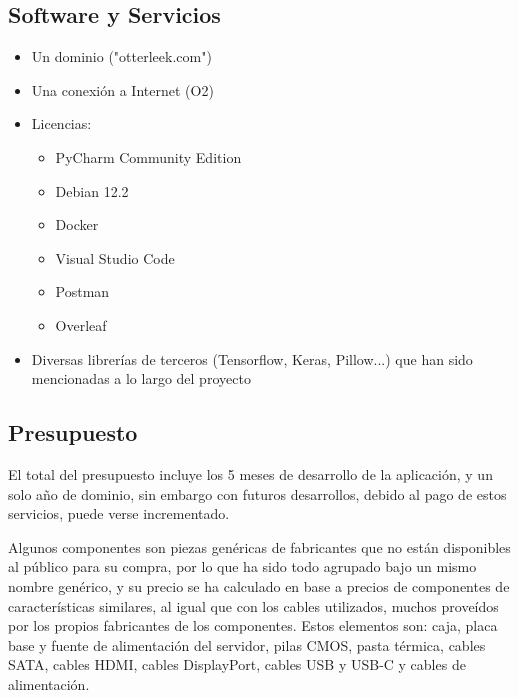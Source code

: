 \documentclass{article}
\begin{document}
\subsection{Software y Servicios}
\begin{itemize}
	\item Un dominio ("otterleek.com")
	\item Una conexión a Internet (O2)
	\item Licencias:
	\begin{itemize}
    	\item PyCharm Community Edition
    	\item Debian 12.2
    	\item Docker
    	\item Visual Studio Code
    	\item Postman
    	\item Overleaf
	\end{itemize}
	\item Diversas librerías de terceros (Tensorflow, Keras, Pillow...) que han sido mencionadas a lo largo del proyecto
\end{itemize}
\newpage

\subsection{Presupuesto}

El total del presupuesto incluye los 5 meses de desarrollo de la aplicación, y un solo año de dominio, sin embargo con futuros desarrollos, debido al pago de estos servicios, puede verse incrementado.

Algunos componentes son piezas genéricas de fabricantes que no están disponibles al público para su compra, por lo que ha sido todo agrupado bajo un mismo nombre genérico, y su precio se ha calculado en base a precios de componentes de características similares, al igual que con los cables utilizados, muchos proveídos por los propios fabricantes de los componentes. Estos elementos son: caja, placa base y fuente de alimentación del servidor, pilas CMOS, pasta térmica, cables SATA, cables HDMI, cables DisplayPort, cables USB y USB-C y cables de alimentación.\\
    
\end{document}
